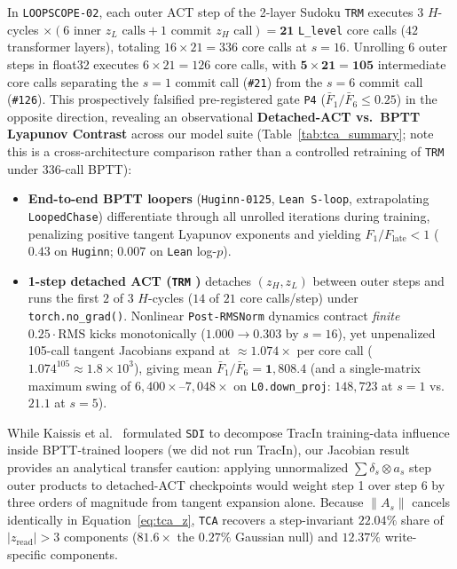 \documentclass[10pt,letterpaper]{article}
\begin{document}
In \texttt{LOOPSCOPE-02}, each outer ACT step of the 2-layer Sudoku \texttt{TRM} executes $3$ $H$-cycles $\times (6 \text{ inner } z_L \text{ calls} + 1 \text{ commit } z_H \text{ call}) = \mathbf{21}$ \texttt{L\_level} core calls ($42$ transformer layers), totaling $16 \times 21 = 336$ core calls at $s=16$. Unrolling 6 outer steps in float32 executes $6 \times 21 = 126$ core calls, with $\mathbf{5 \times 21 = 105}$ intermediate core calls separating the $s=1$ commit call (\texttt{\#21}) from the $s=6$ commit call (\texttt{\#126}). This prospectively falsified pre-registered gate \texttt{P4} ($\bar{F}_1/\bar{F}_6 \le 0.25$) in the opposite direction, revealing an observational \textbf{Detached-ACT vs.\ BPTT Lyapunov Contrast} across our model suite (Table~\ref{tab:tca_summary}; note this is a cross-architecture comparison rather than a controlled retraining of \texttt{TRM} under 336-call BPTT):
\begin{itemize}
  \item \textbf{End-to-end BPTT loopers} (\texttt{Huginn-0125}, \texttt{Lean S-loop}, extrapolating \texttt{LoopedChase}) differentiate through all unrolled iterations during training, penalizing positive tangent Lyapunov exponents and yielding $F_1 / F_{\mathrm{late}} < 1$ ($0.43$ on \texttt{Huginn}; $0.007$ on \texttt{Lean} log-$p$).
  \item \textbf{1-step detached ACT (\texttt{TRM} \cite{jolicoeur2025trm})} detaches $(z_H, z_L)$ between outer steps and runs the first $2$ of $3$ $H$-cycles ($14$ of $21$ core calls/step) under \texttt{torch.no\_grad()}. Nonlinear \texttt{Post-RMSNorm} dynamics contract \emph{finite} $0.25\cdot\mathrm{RMS}$ kicks monotonically ($1.000 \to 0.303$ by $s=16$), yet unpenalized 105-call tangent Jacobians expand at $\approx 1.074\times$ per core call ($1.074^{105} \approx 1.8\times 10^3$), giving mean $\bar{F}_1/\bar{F}_6 = \mathbf{1{,}808.4}$ (and a single-matrix maximum swing of $6{,}400\times$--$7{,}048\times$ on \texttt{L0.down\_proj}: $148{,}723$ at $s=1$ vs.\ $21.1$ at $s=5$).
\end{itemize}
While Kaissis et al.\ \cite{kaissis2026sdi} formulated \texttt{SDI} to decompose TracIn training-data influence inside BPTT-trained loopers (we did not run TracIn), our Jacobian result provides an analytical transfer caution: applying unnormalized $\sum \delta_s \otimes a_s$ step outer products to detached-ACT checkpoints would weight step 1 over step 6 by three orders of magnitude from tangent expansion alone. Because $\|A_s\|$ cancels identically in Equation~\eqref{eq:tca_z}, \texttt{TCA} recovers a step-invariant $\mathbf{22.04\%}$ share of $|z_{\mathrm{read}}| > 3$ components ($81.6\times$ the $0.27\%$ Gaussian null) and $12.37\%$ write-specific components.
\end{document}
